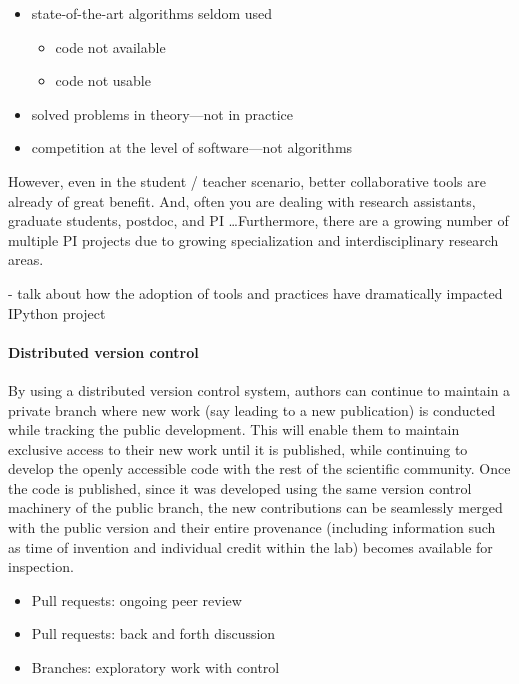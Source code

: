 \documentclass[ChapterTOCs,krantz2]{krantz} %
\begin{document}
\begin{itemize}
\item  state-of-the-art algorithms seldom used

\begin{itemize}
\item code not available
\item code not usable
\end{itemize}

\item solved problems in theory---not in practice
\item competition at the level of software---not algorithms
\end{itemize}

However, even in the student / teacher scenario, better collaborative tools
are already of great benefit.  And, often you are dealing with research
assistants, graduate students, postdoc, and PI \ldots  Furthermore, there are a
growing number of multiple PI projects due to growing specialization and
interdisciplinary research areas.

- talk about how the adoption of tools and practices have dramatically
impacted IPython project

\paragraph{ {\bf Distributed version control}}

By using a distributed version control system, authors can continue
to maintain a private branch where new work (say leading to a new
publication) is conducted while tracking the public development. This
will enable them to maintain exclusive access to their new work until
it is published, while continuing to develop the openly accessible
code with the rest of the scientific community. Once the code is published,
since it was developed using the same version control machinery of
the public branch, the new contributions can be seamlessly merged
with the public version and their entire provenance (including information
such as time of invention and individual credit within the lab) becomes
available for inspection.

\begin{itemize}

\item Pull requests: ongoing peer review

\item Pull requests: back and forth discussion

\item Branches: exploratory work with control

\end{itemize}
\end{document}
